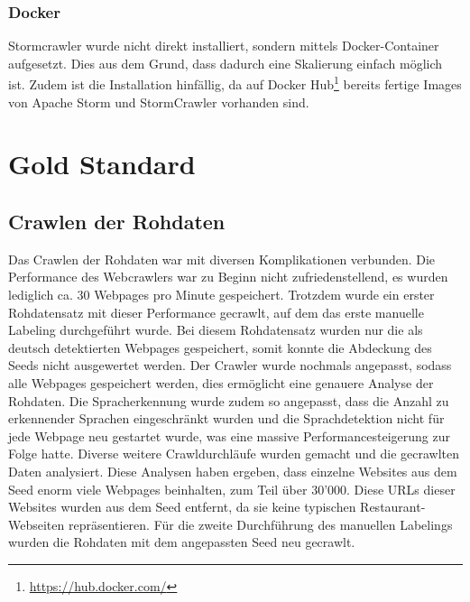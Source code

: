 \subsubsection{Docker}
Stormcrawler wurde nicht direkt installiert, sondern mittels Docker-Container aufgesetzt.
Dies aus dem Grund, dass dadurch eine Skalierung einfach möglich ist.
Zudem ist die Installation hinfällig, da auf Docker Hub\footnote{\url{https://hub.docker.com/}} bereits fertige Images von Apache Storm und StormCrawler vorhanden sind.
\section{Gold Standard}
\subsection{Crawlen der Rohdaten}
Das Crawlen der Rohdaten war mit diversen Komplikationen verbunden.
Die Performance des Webcrawlers war zu Beginn nicht zufriedenstellend, es wurden lediglich ca. 30 Webpages pro Minute gespeichert.
Trotzdem wurde ein erster Rohdatensatz mit dieser Performance gecrawlt, auf dem das erste manuelle Labeling durchgeführt wurde.
Bei diesem Rohdatensatz wurden nur die als deutsch detektierten Webpages gespeichert, somit konnte die Abdeckung des Seeds nicht ausgewertet werden.
Der Crawler wurde nochmals angepasst, sodass alle Webpages gespeichert werden, dies ermöglicht eine genauere Analyse der Rohdaten.
Die Spracherkennung wurde zudem so angepasst, dass die Anzahl zu erkennender Sprachen eingeschränkt wurden und die Sprachdetektion nicht für jede Webpage neu gestartet wurde, was eine massive Performancesteigerung zur Folge hatte.
Diverse weitere Crawldurchläufe wurden gemacht und die gecrawlten Daten analysiert.
Diese Analysen haben ergeben, dass einzelne Websites aus dem Seed enorm viele Webpages beinhalten, zum Teil über 30'000.
Diese URLs dieser Websites wurden aus dem Seed entfernt, da sie keine typischen Restaurant-Webseiten repräsentieren.
Für die zweite Durchführung des manuellen Labelings wurden die Rohdaten mit dem angepassten Seed neu gecrawlt.
